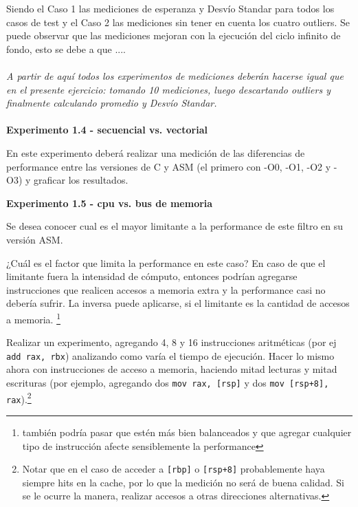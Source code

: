 \newpage
\indent Siendo el Caso 1 las mediciones de esperanza y Desvío Standar para todos los casos de test y el Caso 2 las mediciones sin tener en cuenta los cuatro outliers. Se puede observar que las mediciones mejoran con la ejecuci\'on del ciclo infinito de fondo, esto se debe a que .... \textbf{\color{red}{???????????????}} \\
\\
\textit{A partir de aquí todos los experimentos de mediciones deberán hacerse igual 
que en el presente ejercicio: tomando 10 mediciones, luego descartando 
outliers y finalmente calculando promedio y Desvío Standar.}\\
\\
\noindent\textbf{Experimento 1.4 - secuencial vs. vectorial}

En este experimento deberá realizar una medición de las diferencias de 
performance entre las versiones de C y ASM (el primero con -O0, -O1, -O2 y -O3) 
y graficar los resultados.

\vspace*{0.3cm} \noindent
\textbf{Experimento 1.5 - cpu vs. bus de memoria}

Se desea conocer cual es el mayor limitante a la
performance de este filtro en su versión ASM.

¿Cuál es el factor que limita la performance en este caso?
En caso de que el limitante fuera la intensidad de cómputo, entonces 
podrían agregarse instrucciones que realicen accesos a memoria extra y la
performance casi no debería sufrir. 
La inversa puede aplicarse, si el limitante es la cantidad de accesos a memoria.
\footnote{también podría pasar que estén más bien balanceados y que agregar
cualquier tipo de instrucción afecte sensiblemente la performance}
	
Realizar un experimento, agregando 4, 8 y 16 instrucciones aritméticas 
(por ej \verb|add rax, rbx|) analizando como varía el tiempo de ejecución.
Hacer lo mismo ahora con instrucciones de acceso a memoria, haciendo 
mitad lecturas y mitad escrituras (por ejemplo, agregando dos 
\verb|mov rax, [rsp]| y dos \verb|mov [rsp+8], rax|).\footnote{Notar que en el caso de acceder a \texttt{[rbp]} o \texttt{[rsp+8]} probablemente haya siempre hits en la cache, por lo que la medición no será de buena calidad. Si se le ocurre la manera, realizar accesos a otras direcciones alternativas.}
	
